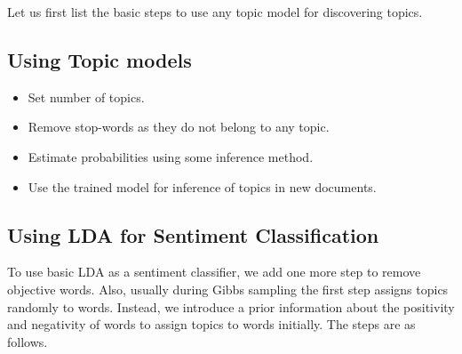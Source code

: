 Let us first list the basic steps to use any topic model for discovering topics.

\subsection{Using Topic models}

\begin{itemize}
 \item Set number of topics.
 \item Remove stop-words as they do not belong to any topic.
 \item Estimate probabilities using some inference method.
 \item Use the trained model for inference of topics in new documents.
\end{itemize}

\subsection{Using LDA for Sentiment Classification}

To use basic LDA as a sentiment classifier, we add one more step to remove objective words. Also, usually during Gibbs sampling the first step assigns topics 
randomly to words. Instead, we introduce a prior information about the positivity and negativity of words to assign topics to words initially. The steps are 
as follows.

